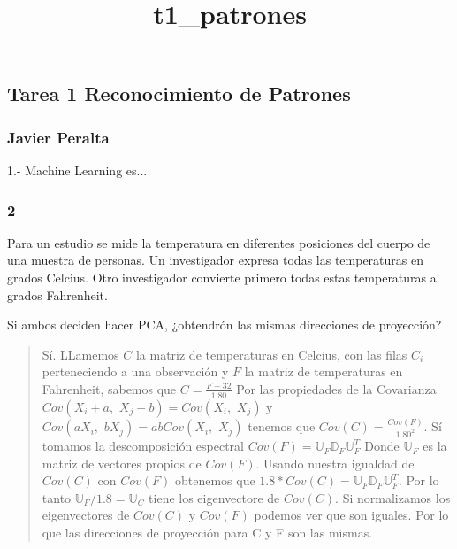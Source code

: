 \documentclass[11pt]{article}
\title{t1\_patrones}
\begin{document}
    
    
    \maketitle
    
    

    
    \subsection{Tarea 1 Reconocimiento de
Patrones}\label{tarea-1-reconocimiento-de-patrones}

\subsubsection{Javier Peralta}\label{javier-peralta}

1.- Machine Learning es...

    \subsubsection{2}\label{section}

Para un estudio se mide la temperatura en diferentes posiciones del
cuerpo de una muestra de personas. Un investigador expresa todas las
temperaturas en grados Celcius. Otro investigador convierte primero
todas estas temperaturas a grados Fahrenheit.

Si ambos deciden hacer PCA, ¿obtendrón las mismas direcciones de
proyección?

\begin{quote}
Sí. LLamemos \(C\) la matriz de temperaturas en Celcius, con las filas
\(C_i\) perteneciendo a una observación y \(F\) la matriz de
temperaturas en Fahrenheit, sabemos que \(C = \frac{F - 32}{1.80}\) Por
las propiedades de la Covarianza
\(Cov(X_i+a,\,\, X_j+b) = Cov(X_i,\,\,X_j)\) y
\(Cov(aX_i,\,\, bX_j) = abCov(X_i,\,\,X_j)\) tenemos que
\(Cov(C) = \frac{Cov(F)}{1.80^2}\). Sí tomamos la descomposición
espectral \(Cov(F) = \mathbb{U}_F\mathbb{D}_F\mathbb{U}_F^T\) Donde
\(\mathbb{U}_F\) es la matriz de vectores propios de \(Cov(F)\). Usando
nuestra igualdad de \(Cov(C)\) con \(Cov(F)\) obtenemos que
\(1.8 * Cov(C) = \mathbb{U}_F\mathbb{D}_F\mathbb{U}_F^T\). Por lo tanto
\(\mathbb{U}_F/1.8 = \mathbb{U}_C\) tiene los eigenvectore de
\(Cov(C)\). Si normalizamos los eigenvectores de \(Cov(C)\) y \(Cov(F)\)
podemos ver que son iguales. Por lo que las direcciones de proyección
para C y F son las mismas.
\end{quote}
\end{document}

